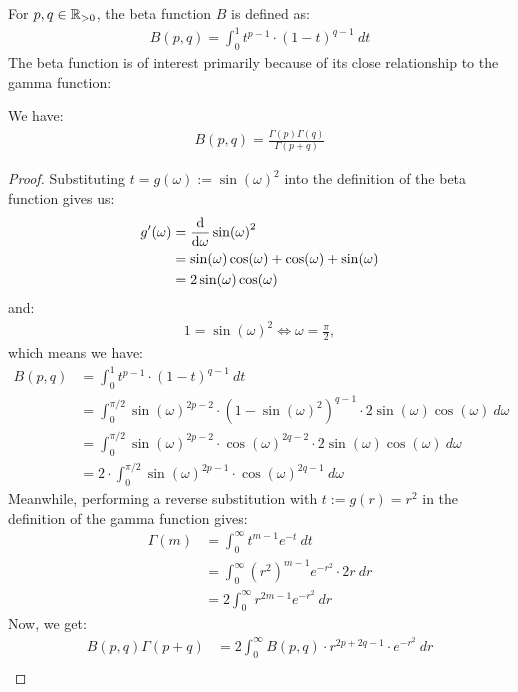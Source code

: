 \pagebreak
\begin{example} 
	For $p,q \in \mathbb{R}_{> 0}$, the beta function $B$ is defined as:
	\begin{align*}
		B(p,q) = \int_{0}^1 t^{p-1} \cdot (1-t)^{q-1} ~dt
	\end{align*}
	The beta function is of interest primarily because of its close relationship to the gamma function:
	\begin{theorem}
		We have:
		\begin{align*}
			B(p,q) = \frac{\Gamma(p)\Gamma(q)}{\Gamma(p+q)}
		\end{align*}
	\end{theorem}
	\begin{proof}
		Substituting $t = g(\omega) := \sin(\omega)^2$ into the definition of the beta function gives us:
		\begin{align*}
			g'(\omega) &= \dv{\omega} \sin(\omega)^2\\
			&= \sin(\omega)\cos(\omega) + \cos(\omega) + \sin(\omega)\\
			&= 2 \sin(\omega) \cos(\omega)
		\end{align*}
		and:
		\begin{align*}
			1 = \sin(\omega)^2 \Leftrightarrow \omega = \frac{\pi}{2},
		\end{align*}
		which means we have:
		\begin{align*}
			B(p,q) 
			&= \int_{0}^1 t^{p-1} \cdot (1-t)^{q-1} ~dt\\
			&= \int_{0}^{\pi/2} \sin(\omega)^{2p-2} \cdot (1-\sin(\omega)^2)^{q-1} \cdot 2\sin(\omega) \cos(\omega) ~d\omega\\
			&= \int_{0}^{\pi/2} \sin(\omega)^{2p-2} \cdot \cos(\omega)^{2q-2} \cdot 2\sin(\omega) \cos(\omega) ~d\omega\\
			&= 2 \cdot \int_{0}^{\pi/2} \sin(\omega)^{2p-1} \cdot \cos(\omega)^{2q-1} ~d\omega
		\end{align*}
		Meanwhile, performing a reverse substitution with $t := g(r) = r^2$ in the definition of the gamma function gives:
		\begin{align*}
			\Gamma(m) 
			&= \int_0^\infty t^{m-1} e^{-t} ~dt\\
			&= \int_0^\infty (r^2)^{m-1} e^{-r^2} \cdot 2r ~dr\\
			&= 2 \int_0^\infty r^{2m-1} e^{-r^2} ~dr
		\end{align*}
		Now, we get:
		\begin{align*}
			B(p,q)\Gamma(p+q)
			&=
			2 \int_0^\infty B(p,q) \cdot r^{2p + 2q - 1} \cdot e^{-r^2} ~dr\\

\end{align*}
\end{proof}
\end{example}
